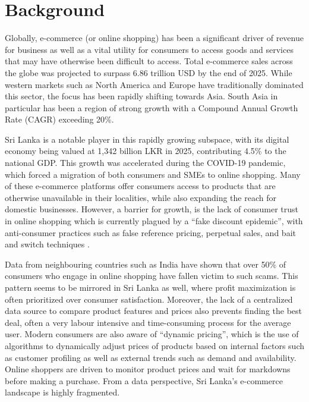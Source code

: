\section{Background}\label{sec:background}

Globally, e-commerce (or online shopping) has been a significant driver of revenue for business as well as a vital utility for consumers to access goods and services that may have otherwise been difficult to access.
Total e-commerce sales across the globe was projected to surpass 6.86 trillion USD by the end of 2025\cite{sellerscommerce2026ecommerce}.
While western markets such as North America and Europe have traditionally dominated this sector, the focus has been rapidly shifting towards Asia.
South Asia in particular has been a region of strong growth with a Compound Annual Growth Rate (CAGR) exceeding 20\%\cite{koutsou-wehling2025southeast}.

Sri Lanka is a notable player in this rapidly growing subspace, with its digital economy being valued at 1,342 billion LKR in 2025, contributing 4.5\% to the national GDP\cite{dailyft2025lankan}.
This growth was accelerated during the COVID-19 pandemic, which forced a migration of both consumers and SMEs to online shopping.
Many of these e-commerce platforms offer consumers access to products that are otherwise unavailable in their localities, while also expanding the reach for domestic businesses\cite{slasscom2023daraz}.
However, a barrier for growth, is the lack of consumer trust in online shopping which is currently plagued by a “fake discount epidemic”, with anti-consumer practices such as false reference pricing, perpetual sales, and bait and switch techniques \cite{devarmani2025fake}.

Data from neighbouring countries such as India have shown that over 50\% of consumers who engage in online shopping have fallen victim to such scams\cite{economictimes2019over}.
This pattern seems to be mirrored in Sri Lanka as well, where profit maximization is often prioritized over consumer satisfaction.
Moreover, the lack of a centralized data source to compare product features and prices also prevents finding the best deal, often a very labour intensive and time-consuming process for the average user.
Modern consumers are also aware of “dynamic pricing”, which is the use of algorithms to dynamically adjust prices of products based on internal factors such as customer profiling as well as external trends such as demand and availability.
Online shoppers are driven to monitor product prices and wait for markdowns before making a purchase\cite{victor2018price}.
From a data perspective, Sri Lanka’s e-commerce landscape is highly fragmented.

